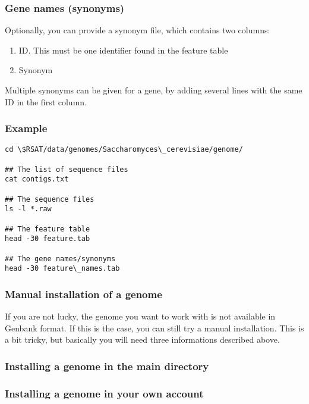 \subsubsection{Gene names (synonyms)}

Optionally, you can provide a synonym file, which contains two
columns:

\begin{enumerate}
\item ID. This must be one identifier found in the feature table
\item Synonym
\end{enumerate}

Multiple synonyms can be given for a gene, by adding several lines with
the same ID in the first column.

\subsubsection{Example}

\begin{verbatim}
cd \$RSAT/data/genomes/Saccharomyces\_cerevisiae/genome/

## The list of sequence files
cat contigs.txt

## The sequence files
ls -l *.raw

## The feature table
head -30 feature.tab

## The gene names/synonyms
head -30 feature\_names.tab

\end{verbatim}

\subsubsection{Manual installation of a genome}

If you are not lucky, the genome you want to work with is not
available in Genbank format. If this is the case, you can still try a
manual installation. This is a bit tricky, but basically you will need
three informations described above. 

\subsubsection{Installing a genome in the main \RSAT directory}


\subsubsection{Installing a genome in your own account}

